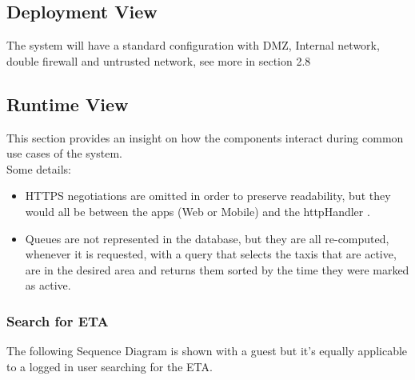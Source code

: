 \documentclass{article}
\begin{document}
	\subsection{Deployment View}
	\begin{figure}[H]
	\end{figure}
	The system will have a standard configuration with DMZ, Internal network, double firewall and untrusted network, see more in section 2.8
	\subsection{Runtime View}
	This section provides an insight on how the components interact during common use cases of the system. \\
	Some details:
	\begin{itemize}
		\item HTTPS negotiations are omitted in order to preserve readability, but they would all be between the apps (Web or Mobile) and the httpHandler .
		\item Queues are not represented in the database, but they are all re-computed, whenever it is requested, with a query that selects the taxis that are active, are in the desired area and returns them sorted by the time they were marked as active.
	\end{itemize}
	\subsubsection{Search for ETA}
	The following Sequence Diagram is shown with a guest but it's equally applicable to a logged in user searching for the ETA. 
	\begin{figure}[H]
	\end{figure}
	\clearpage
\end{document}
